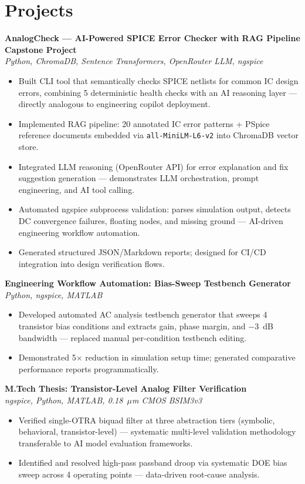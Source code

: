 \documentclass[9pt,a4paper]{extarticle}
\begin{document}
\section{Projects}

\noindent\textbf{AnalogCheck --- AI-Powered SPICE Error Checker with RAG Pipeline} \hfill\textbf{Capstone Project}\\
\emph{Python, ChromaDB, Sentence Transformers, OpenRouter LLM, ngspice}
\begin{itemize}
  \item Built CLI tool that semantically checks SPICE netlists for common IC design errors, combining 5 deterministic health checks with an AI reasoning layer --- directly analogous to engineering copilot deployment.
  \item Implemented RAG pipeline: 20 annotated IC error patterns + PSpice reference documents embedded via \texttt{all-MiniLM-L6-v2} into ChromaDB vector store.
  \item Integrated LLM reasoning (OpenRouter API) for error explanation and fix suggestion generation --- demonstrates LLM orchestration, prompt engineering, and AI tool calling.
  \item Automated ngspice subprocess validation: parses simulation output, detects DC convergence failures, floating nodes, and missing ground --- AI-driven engineering workflow automation.
  \item Generated structured JSON/Markdown reports; designed for CI/CD integration into design verification flows.
\end{itemize}
\vspace{6pt}

\noindent\textbf{Engineering Workflow Automation: Bias-Sweep Testbench Generator}\\
\emph{Python, ngspice, MATLAB}
\begin{itemize}
  \item Developed automated AC analysis testbench generator that sweeps 4 transistor bias conditions and extracts gain, phase margin, and $-3$\ dB bandwidth --- replaced manual per-condition testbench editing.
  \item Demonstrated 5$\times$ reduction in simulation setup time; generated comparative performance reports programmatically.
\end{itemize}
\vspace{6pt}

\noindent\textbf{M.Tech Thesis: Transistor-Level Analog Filter Verification}\\
\emph{ngspice, Python, MATLAB, 0.18\ $\mu$m CMOS BSIM3v3}
\begin{itemize}
  \item Verified single-OTRA biquad filter at three abstraction tiers (symbolic, behavioral, transistor-level) --- systematic multi-level validation methodology transferable to AI model evaluation frameworks.
  \item Identified and resolved high-pass passband droop via systematic DOE bias sweep across 4 operating points --- data-driven root-cause analysis.
\end{itemize}
\end{document}
